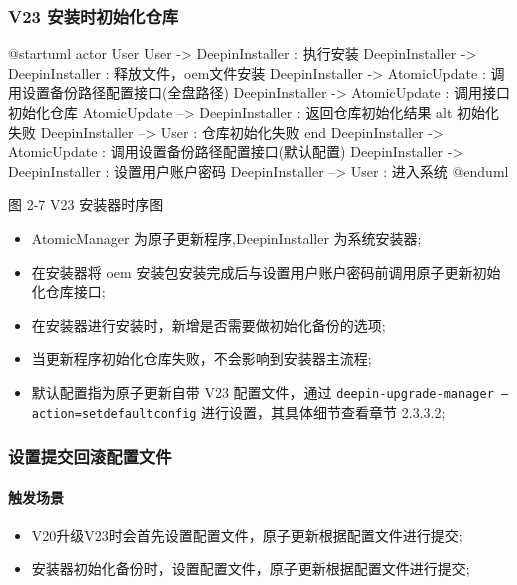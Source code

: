 \documentclass{utart}
\begin{document}
\subsubsection{V23 安装时初始化仓库}
\begin{center}
  \begin{adjustbox}{scale=0.65}
    \begin{plantuml}
      @startuml
      actor User
      User -> DeepinInstaller : 执行安装
      DeepinInstaller -> DeepinInstaller : 释放文件，oem文件安装
      DeepinInstaller -> AtomicUpdate : 调用设置备份路径配置接口(全盘路径)
      DeepinInstaller -> AtomicUpdate : 调用接口初始化仓库
      AtomicUpdate --> DeepinInstaller : 返回仓库初始化结果
      alt 初始化失败
      DeepinInstaller --> User : 仓库初始化失败
      end
      DeepinInstaller -> AtomicUpdate : 调用设置备份路径配置接口(默认配置)
      DeepinInstaller -> DeepinInstaller : 设置用户账户密码
      DeepinInstaller --> User : 进入系统
      @enduml
      \end{plantuml}
    \end{adjustbox}

    图 2-7 V23 安装器时序图
\end{center}
\begin{itemize}[leftmargin=4em]
  \item AtomicManager 为原子更新程序,DeepinInstaller 为系统安装器;
  \item 在安装器将 oem 安装包安装完成后与设置用户账户密码前调用原子更新初始化仓库接口;
  \item 在安装器进行安装时，新增是否需要做初始化备份的选项;
  \item 当更新程序初始化仓库失败，不会影响到安装器主流程;
  \item 默认配置指为原子更新自带 V23 配置文件，通过 \texttt{deepin-upgrade-manager --action=setdefaultconfig} 进行设置，其具体细节查看章节 2.3.3.2;
\end{itemize}

\subsubsection{设置提交回滚配置文件}
\paragraph{触发场景}
\begin{itemize}[leftmargin=4em]
  \item V20升级V23时会首先设置配置文件，原子更新根据配置文件进行提交;
  \item 安装器初始化备份时，设置配置文件，原子更新根据配置文件进行提交;
\end{itemize}
\end{document}
